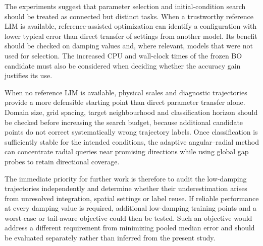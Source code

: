 \begin{greenrevision}
The experiments suggest that parameter selection and initial-condition search should be treated as connected but distinct tasks. When a trustworthy reference LIM is available, reference-assisted optimization can identify a configuration with lower typical error than direct transfer of settings from another model. Its benefit should be checked on damping values and, where relevant, models that were not used for selection. The increased CPU and wall-clock times of the frozen BO candidate must also be considered when deciding whether the accuracy gain justifies its use.

When no reference LIM is available, physical scales and diagnostic trajectories provide a more defensible starting point than direct parameter transfer alone. Domain size, grid spacing, target neighbourhood and classification horizon should be checked before increasing the search budget, because additional candidate points do not correct systematically wrong trajectory labels. Once classification is sufficiently stable for the intended conditions, the adaptive angular--radial method can concentrate radial queries near promising directions while using global gap probes to retain directional coverage.

The immediate priority for further work is therefore to audit the low-damping trajectories independently and determine whether their underestimation arises from unresolved integration, spatial settings or label reuse. If reliable performance at every damping value is required, additional low-damping training points and a worst-case or tail-aware objective could then be tested. Such an objective would address a different requirement from minimizing pooled median error and should be evaluated separately rather than inferred from the present study.
\end{greenrevision}
